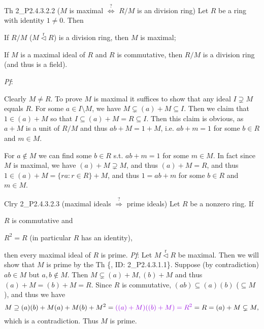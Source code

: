 \documentclass{article}
\newcommand{\nles}{\vartriangleleft}
\newcommand{\ideal}{\overset{\text{r}}{\nles}} %
\begin{document}
\begin{Th}{Th 2\_P2.4.3.2.2 ($M$ is maximal $\overset{?}{\Longleftrightarrow}$ $R/M$ is an division ring)}
    Let $R$ be a ring with identity $1\neq 0$. Then
    \begin{compactenum}
        \item If $R/M$ ($M\ideal R$) is a division ring, then $M$ is maximal;
        \item If $M$ is a maximal ideal of $R$ and $R$ is commutative, then $R/M$ is a division ring (and thus is a field).
    \end{compactenum}
    \tcblower
    \textit{Pf}: 
    \begin{compactenum}
        \item Clearly $M\neq R$. To prove $M$ is maximal it suffices to show that any ideal $I\supsetneq M$ equals $R$. For some $a\in I\setminus M$, we have $M\subsetneq (a)+M\subseteq I$. Then we claim that $1\in (a)+M$ so that $I\subseteq (a)+M = R\subseteq I$. Then this claim is obvious, as $a+M$ is a unit of $R/M$ and thus $ab+M = 1+M$, i.e. $ab+m = 1$ for some $b\in R$ and $m\in M$. 
        \item For $a\notin M$ we can find some $b\in R$ s.t. $ab+m = 1$ for some $m\in M$. In fact since $M$ is maximal, we have $(a)+M\supsetneq M$, and thus $(a)+M=R$, and thus $1\in (a)+M = \{ra: r\in R\}+M$, and thus $1 = ab+m$ for some $b\in R$ and $m\in M$. 
    \end{compactenum}
\end{Th}

\begin{Th}{Clry 2\_P2.4.3.2.3 (maximal ideals $\overset{?}{\Longrightarrow}$ prime ideals)}
    Let $R$ be a nonzero ring. If
    \begin{compactenum}
        \item $R$ is commutative and
        \item $R^2 = R$ (in particular $R$ has an identity),
    \end{compactenum}
    then every maximal ideal of $R$ is prime.
    \tcblower
    \textit{Pf}: Let $M\ideal R$ be maximal. Then we will show that $M$ is prime by the Th \{, ID: 2\_P2.4.3.1.1\}. Suppose (by contradiction) $ab\in M$ but $a, b\notin M$. Then $M\subsetneq (a)+M, (b)+M$ and thus $(a)+M = (b)+M = R$. Since $R$ is commutative, $(ab)\subseteq (a)(b)$ ($\subseteq M$), and thus we have
    $$ M\supseteq (a)(b) + M(a) + M(b) + M^2 = \textcolor{P}{((a) + M)((b) + M) = R^2} = R = (a)+M\subsetneq M, $$
    which is a contradiction. Thus $M$ is prime.
\end{Th}
\end{document}
